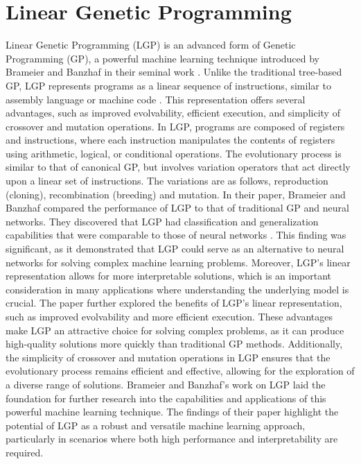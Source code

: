 \documentclass[12pt, final]{dalcsthesis}
\begin{document}
\section{Linear Genetic Programming}
Linear Genetic Programming (LGP) is an advanced form of Genetic Programming (GP), a powerful machine learning technique introduced by Brameier and Banzhaf in their seminal work \cite{brameier2001comparison}. Unlike the traditional tree-based GP, LGP represents programs as a linear sequence of instructions, similar to assembly language or machine code \cite{koza93}. This representation offers several advantages, such as improved evolvability, efficient execution, and simplicity of crossover and mutation operations.
In LGP, programs are composed of registers and instructions, where each instruction manipulates the contents of registers using arithmetic, logical, or conditional operations. The evolutionary process is similar to that of canonical GP, but involves variation operators that act directly upon a linear set of instructions. The variations are as follows, reproduction (cloning), recombination (breeding) and mutation.
In their paper, Brameier and Banzhaf compared the performance of LGP to that of traditional GP and neural networks. They discovered that LGP had classification and generalization capabilities that were comparable to those of neural networks \cite{brameier2001comparison}. This finding was significant, as it demonstrated that LGP could serve as an alternative to neural networks for solving complex machine learning problems. Moreover, LGP's linear representation allows for more interpretable solutions, which is an important consideration in many applications where understanding the underlying model is crucial.
The paper further explored the benefits of LGP's linear representation, such as improved evolvability and more efficient execution. These advantages make LGP an attractive choice for solving complex problems, as it can produce high-quality solutions more quickly than traditional GP methods. Additionally, the simplicity of crossover and mutation operations in LGP ensures that the evolutionary process remains efficient and effective, allowing for the exploration of a diverse range of solutions.
Brameier and Banzhaf's work on LGP laid the foundation for further research into the capabilities and applications of this powerful machine learning technique. The findings of their paper highlight the potential of LGP as a robust and versatile machine learning approach, particularly in scenarios where both high performance and interpretability are required.
\end{document}
